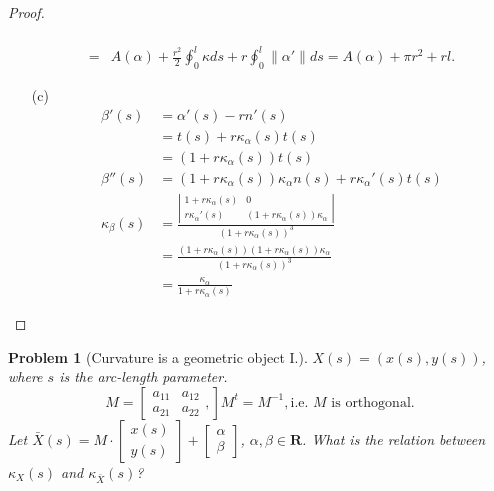\documentclass[12pt,a4paper]{article}
\newcounter{theProblemCounter}
\newtheorem{problem}[theProblemCounter]{Problem}
\begin{document}
\begin{proof}
\begin{enumerate}
\begin{align*}
\\=& A(\alpha) + \frac{r^2}2\oint_0^l \kappa ds + r\oint_0^l\|\alpha'\| ds = A(\alpha) + \pi r^2 + rl.
\end{align*}
\item[(c)]
\begin{align*}
\beta'(s)&=\alpha'(s)-rn'(s)\\
&=t(s)+r\kappa_\alpha(s)t(s)\\
&=(1+r\kappa_\alpha(s))t(s)\\
\beta''(s)&=(1+r\kappa_\alpha(s))\kappa_\alpha n(s)+r\kappa_\alpha'(s) t(s)\\
\kappa_\beta(s)&=\frac{\left|
\begin{array}{cc} 1+r\kappa_\alpha(s) & 0 \\ r\kappa_\alpha'(s) & (1+r\kappa_\alpha(s))\kappa_\alpha \end{array}
\right|}{(1+r\kappa_\alpha(s))^3}\\
&=\frac{(1+r\kappa_\alpha(s))(1+r\kappa_\alpha(s))\kappa_\alpha}{(1+r\kappa_\alpha(s))^3}\\
&=\frac{\kappa_\alpha}{1+r\kappa_\alpha(s)}
\end{align*}
\end{enumerate}

\end{proof}
\setcounter{theProblemCounter}{7}
\begin{problem}[Curvature is a geometric object I.]
$X(s)=(x(s), y(s))$, where $s$ is the arc-length parameter.
\[ M = \left[
\begin{array}{cc} a_{11} & a_{12} \\ a_{21} & a_{22} \end{array},
\right]
M^t = M^{-1}, \mbox{i.e. $M$ is orthogonal.}
\]
Let $\bar{X}(s) = M\cdot \left[\begin{array}{c} x(s)\\y(s)\end{array}\right] + \left[\begin{array}{c}\alpha \\ \beta\end{array}\right]$,  $\alpha, \beta\in \mathbf{R}$. What is the relation between $\kappa_X(s)$ and $\kappa_{\bar{X}}(s)$?
\end{problem}
\end{document}
